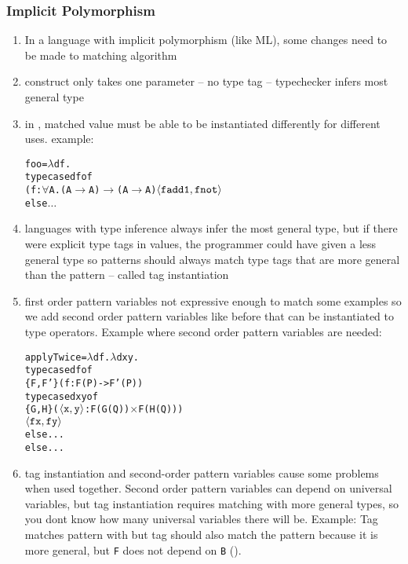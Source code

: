 \documentclass[12pt]{article}	%
\begin{document}
\subsubsection*{Implicit Polymorphism}
\begin{enumerate}
	\item In a language with implicit polymorphism (like ML), some changes need to be made to matching algorithm
	\item \dynamic construct only takes one parameter -- no type tag -- typechecker infers most general type
	\item in \typecase, matched value must be able to be instantiated differently for different uses.
	example:
	\begin{alltt}
	foo = \(\lambda\)df.
	  typecase df of
	    (f:\(\forall\)A.(A\(\rightarrow\)A)\(\rightarrow\)(A\(\rightarrow\)A)\(\pair{\mathtt{f add1}}{\mathtt{f not}}\)
	  else \(\ldots\)
	\end{alltt}
	\item languages with type inference always infer the most general type, but if there were explicit type tags in \Dynamic values, the programmer could have given a less general type so patterns should always match type tags that are more general than the pattern -- called tag instantiation
	\item first order pattern variables not expressive enough to match some examples so we add second order pattern variables like before that can be instantiated to type operators. Example where second order pattern variables are needed:
	\begin{alltt}
	applyTwice = \(\lambda\)df.\(\lambda\)dxy.
	  typecase df of
	    \{F,F'\} (f:F(P)->F'(P))
	      typecase dxy of
	        \{G,H\} (\(\pairtt{x}{y}\):F(G(Q)) \(\times\) F(H(Q)))
	          \(\pairtt{f x}{f y}\)
	      else ...
	   else ...
	\end{alltt}
	\item tag instantiation and second-order pattern variables cause some problems when used together. Second order pattern variables can depend on universal variables, but tag instantiation requires matching with more general types, so you dont know how many universal variables there will be. 
	Example:
	Tag  matches pattern  with  but tag  should also match the pattern because it is more general, but \texttt{F} does not depend on \texttt{B} ().

\end{enumerate}
\end{document}
